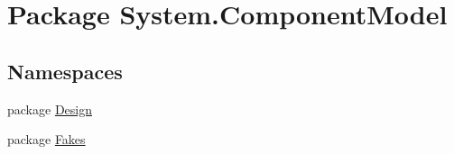 \hypertarget{namespace_system_1_1_component_model}{\section{Package System.\-Component\-Model}
\label{namespace_system_1_1_component_model}
}
\subsection*{Namespaces}
\begin{DoxyCompactItemize}
\item 
package \hyperlink{namespace_system_1_1_component_model_1_1_design}{Design}
\item 
package \hyperlink{namespace_system_1_1_component_model_1_1_fakes}{Fakes}
\end{DoxyCompactItemize}
